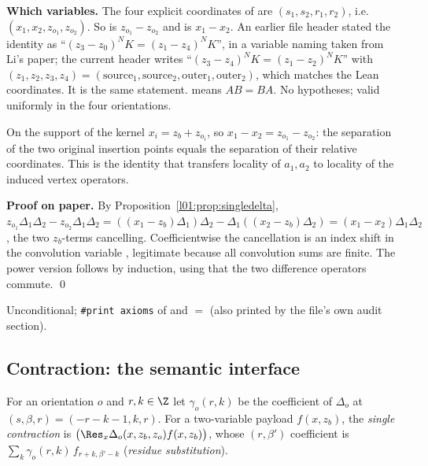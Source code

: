 \begin{dictionary}
\textbf{Which variables.} The four explicit coordinates of  are $(s_1,s_2,r_1,r_2)$, i.e.\ $(x_1,x_2,z_{o_1},z_{o_2})$.
So  is $z_{o_1}-z_{o_2}$ and  is $x_1-x_2$. An earlier file header stated the identity as
``$(z_3-z_0)^NK = (z_1-z_4)^NK$'', in a variable naming taken from Li's paper; the current header writes
``$(z_3-z_4)^NK = (z_1-z_2)^NK$'' with $(z_1,z_2,z_3,z_4) = (\text{source}_1,\text{source}_2,\text{outer}_1,\text{outer}_2)$, which
matches the Lean coordinates. It is the same statement.
 means $AB = BA$. No hypotheses; valid uniformly in the four orientations.
\end{dictionary}

\begin{physics}
On the support of the kernel $x_i = z_b+z_{o_i}$, so $x_1-x_2 = z_{o_1}-z_{o_2}$: the separation of the two original
insertion points equals the separation of their relative coordinates. This is the identity that transfers locality of
$a_1,a_2$ to locality of the induced vertex operators.
\end{physics}

\textbf{Proof on paper.} By Proposition~\ref{l01:prop:singledelta},
$z_{o_1}\Delta_1\Delta_2 - z_{o_2}\Delta_1\Delta_2 = ((x_1-z_b)\Delta_1)\Delta_2-\Delta_1((x_2-z_b)\Delta_2) = (x_1-x_2)\Delta_1\Delta_2$, the two
$z_b$-terms cancelling. Coefficientwise the cancellation is an index shift in the convolution variable , legitimate
because all convolution sums are finite. The power version follows by induction, using that the two difference
operators commute. \qed

\begin{status}
Unconditional; \texttt{\#print axioms} of  and  $=$
 (also printed by the file's own audit section).
\end{status}

\subsection{Contraction: the semantic interface}

\begin{definition}\label{l01:def:contraction}
For an orientation $o$ and $r,k\in\Z$ let $\gamma_o(r,k)$ be the coefficient of $\Delta_o$ at $(s,\beta,r) = (-r-k-1,k,r)$. For a
two-variable payload $f(x,z_b)$, the \emph{single contraction} is
$\big(\Res_x\Delta_o(x,z_b,z_o)f(x,z_b)\big)$, whose $(r,\beta')$ coefficient is
$\sum_k\gamma_o(r,k)\,f_{r+k,\beta'-k}$ (\emph{residue substitution}).
\end{definition}

